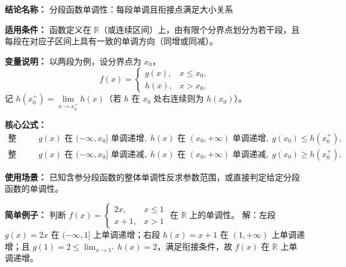 \textbf{结论名称：} 分段函数单调性：每段单调且衔接点满足大小关系

\textbf{适用条件：} 函数定义在 \(\mathbb{R}\)（或连续区间）上，由有限个分界点划分为若干段，且每段在对应子区间上具有一致的单调方向（同增或同减）。

\textbf{变量说明：} 以两段为例，设分界点为 \(x_0\)，
\[
f(x)=\begin{cases}
g(x), & x\le x_0,\\[2pt]
h(x), & x>x_0,
\end{cases}
\]
记 \(h(x_0^+)=\lim\limits_{x\to x_0^+}h(x)\)（若 \(h\) 在 \(x_0\) 处右连续则为 \(h(x_0)\)）。

\textbf{核心公式：}
\[
\boxed{
\begin{aligned}
\text{整体递增:}&\quad g(x) \text{ 在 }(-\infty,x_0]\text{ 单调递增},\; h(x) \text{ 在 }(x_0,+\infty)\text{ 单调递增},\; g(x_0)\le h(x_0^+),\\[4pt]
\text{整体递减:}&\quad g(x) \text{ 在 }(-\infty,x_0]\text{ 单调递减},\; h(x) \text{ 在 }(x_0,+\infty)\text{ 单调递减},\; g(x_0)\ge h(x_0^+).
\end{aligned}
}
\]

\textbf{使用场景：} 已知含参分段函数的整体单调性反求参数范围，或直接判定给定分段函数的单调性。

\textbf{简单例子：} 判断 \(f(x)=\begin{cases} 2x, & x\le 1 \\ x+1, & x>1 \end{cases}\) 在 \(\mathbb{R}\) 上的单调性。
解：左段 \(g(x)=2x\) 在 \((-\infty,1]\) 上单调递增；右段 \(h(x)=x+1\) 在 \((1,+\infty)\) 上单调递增；且 \(g(1)=2\le \lim_{x\to1^+}h(x)=2\)，满足衔接条件，故 \(f(x)\) 在 \(\mathbb{R}\) 上单调递增。